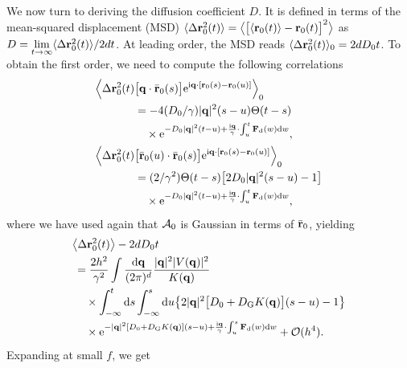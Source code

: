 \documentclass[pre, superscriptaddress, twocolumn,pre]{revtex4-1}
\begin{document}
We now turn to deriving the diffusion coefficient $D$. It is defined in terms of the mean-squared displacement (MSD) $\langle\Delta{\bf r}_0^2(t)\rangle=\big\langle\big[\langle{\bf r}_0(t)\rangle - {\bf r}_0(t)\big]^2\big\rangle$ as $D=\underset{t\to\infty}{\lim}\langle\Delta{\bf r}_0^2(t)\rangle / 2 d t$. At leading order, the MSD reads $\langle\Delta{\bf r}_0^2(t)\rangle_0 = 2dD_0t$. To obtain the first order, we need to compute the following correlations
\begin{equation}
	\begin{aligned}
		\Big\langle\Delta{\bf r}^2_0(t)& \big[{\bf q}\cdot\bar{\bf r}_0(s)\big] {\rm e}^{{\rm i}{\bf q}\cdot[{\bf r}_0(s)-{\bf r}_0(u)]}\Big\rangle_0
		\\
		&= - 4 (D_0/\gamma)|{\bf q}|^2(s-u) \Theta(t-s)
		\\
		&\quad\times{\rm e}^{ - D_0|{\bf q}|^2(t-u) + \frac{{\rm i}{\bf q}}{\gamma}\cdot\int_u^t {\bf F}_{\rm d}(w) {\rm d}w},
		\\
		\Big\langle\Delta{\bf r}^2_0(t)& \big[\bar{\bf r}_0(u)\cdot\bar{\bf r}_0(s)\big] {\rm e}^{{\rm i}{\bf q}\cdot[{\bf r}_0(s)-{\bf r}_0(u)]}\Big\rangle_0
		\\
		&= (2/\gamma^2)\Theta(t-s) \big[2D_0|{\bf q}|^2(s-u)-1\big]
		\\
		&\quad\times{\rm e}^{ - D_0|{\bf q}|^2(t-u) + \frac{{\rm i}{\bf q}}{\gamma}\cdot\int_u^t {\bf F}_{\rm d}(w) {\rm d}w} ,
	\end{aligned}
\end{equation}
where we have used again that ${\cal A}_0$ is Gaussian in terms of $\bar{\bf r}_0$, yielding
\begin{equation}
	\begin{aligned}
		&\big\langle\Delta{\bf r}^2_0(t)\big\rangle - 2 d D_0 t
		\\
		&\,= \frac{2h^2}{\gamma^2} \int \frac{{\rm d}{\bf q}}{(2\pi)^d} \frac{|{\bf q}|^2 |V({\bf q})|^2}{K({\bf q})}
		\\
		&\,\quad\times \int_{-\infty}^t{\rm d}s \int_{-\infty}^s{\rm d}u \big\{ 2|{\bf q}|^2\big[D_0+D_{\rm G}K({\bf q})\big](s-u) - 1\big\}
		\\
		&\,\quad\times {\rm e}^{ -|{\bf q}|^2[D_0+D_{\rm G}K({\bf q})](s-u) + \frac{{\rm i}{\bf q}}{\gamma}\cdot\int_u^s{\bf F}_{\rm d}(w) {\rm d}w } + {\cal O}(h^4) .
	\end{aligned}
\end{equation}
Expanding at small $f$, we get
\end{document}
